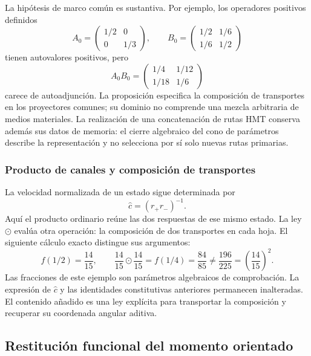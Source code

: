 La hipótesis de marco común es sustantiva. Por ejemplo, los operadores
positivos definidos
\[
 A_0=\begin{pmatrix}1/2&0\\0&1/3\end{pmatrix},\qquad
 B_0=\begin{pmatrix}1/2&1/6\\1/6&1/2\end{pmatrix}
\]
tienen autovalores positivos, pero
\[
 A_0B_0=\begin{pmatrix}1/4&1/12\\1/18&1/6\end{pmatrix}
\]
carece de autoadjunción. La proposición especifica la composición de
transportes en los proyectores comunes; su dominio no comprende una mezcla
arbitraria de medios materiales. La realización de una concatenación de
rutas HMT conserva además sus datos de memoria: el cierre algebraico del
cono de parámetros describe la representación y no selecciona por sí solo
nuevas rutas primarias.

\subsubsection{Producto de canales y composición de transportes}

La velocidad normalizada de un estado sigue determinada por
\[
 \widehat c=(r_+r_-)^{-1}.
\]
Aquí el producto ordinario reúne las dos respuestas de ese mismo estado.
La ley $\odot$ evalúa otra operación: la composición de dos transportes
en cada hoja. El siguiente cálculo exacto distingue sus argumentos:
\begin{equation}
 f(1/2)=\frac{14}{15},\qquad
 \frac{14}{15}\odot\frac{14}{15}=f(1/4)=\frac{84}{85}
 \ne\frac{196}{225}=\left(\frac{14}{15}\right)^2.
 \label{cr28:comp-rational-example}
\end{equation}
Las fracciones de este ejemplo son parámetros algebraicos de comprobación.
La expresión de $\widehat c$ y las identidades constitutivas anteriores
permanecen inalteradas. El contenido añadido es una ley explícita para
transportar la composición y recuperar su coordenada angular aditiva.


\subsection{Restitución funcional del momento orientado}
\label{cr28:sec:catalan-recovery}

